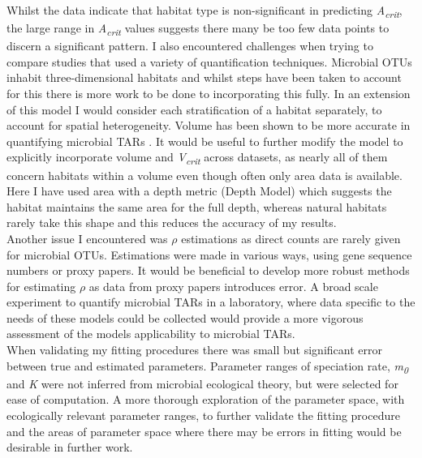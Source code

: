 \noindent Whilst the data indicate that habitat type is non-significant in predicting \textit{A\textsubscript{crit}}, the large range in \textit{A\textsubscript{crit}} values suggests there many be too few data points to discern a significant pattern. I also encountered challenges when trying to compare studies that used a variety of quantification techniques. Microbial OTUs inhabit three-dimensional habitats and whilst steps have been taken to account for this there is more work to be done to incorporating this fully. In an extension of this model I would consider each stratification of a habitat separately, to account for spatial heterogeneity. Volume has been shown to be more accurate in quantifying microbial TARs \cite{van2006bacterial}. It would be useful to further modify the model to explicitly incorporate volume and \textit{V\textsubscript{crit}} across datasets, as nearly all of them concern habitats within a volume even though often only area data is available. Here I have used area with a depth metric (Depth Model) which suggests the habitat maintains the same area for the full depth, whereas natural habitats rarely take this shape and this reduces the accuracy of my results. \\

\noindent Another issue I encountered was $\rho$ estimations as direct counts are rarely given for microbial OTUs. Estimations were made in various ways, using gene sequence numbers or proxy papers. It would be beneficial to develop more robust methods for estimating $\rho$ as data from proxy papers introduces error. A broad scale experiment to quantify microbial TARs in a laboratory, where data specific to the needs of these models could be collected would provide a more vigorous assessment of the models applicability to microbial TARs. \\

\noindent When validating my fitting procedures there was small but significant error between true and estimated parameters. Parameter ranges of speciation rate, \textit{m\textsubscript{0}} and \textit{K} were not inferred from microbial ecological theory, but were selected for ease of computation. A more thorough exploration of the parameter space, with ecologically relevant parameter ranges, to further validate the fitting procedure and the areas of parameter space where there may be errors in fitting would be desirable in further work. \\

